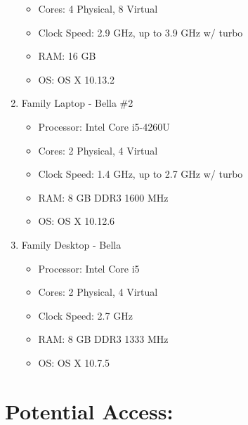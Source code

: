 \documentclass[11pt]{article}
\begin{document}
\begin{enumerate}
{\begin{itemize}
	\item{Cores: 4 Physical, 8 Virtual}
	\item{Clock Speed: 2.9 GHz, up to 3.9 GHz w/ turbo}
	\item{RAM: 16 GB}
	\item{OS: OS X 10.13.2}
	\end{itemize}
	}
\item{Family Laptop - Bella \#2
	\begin{itemize}
	\item{Processor: Intel Core i5-4260U}
	\item{Cores: 2 Physical, 4 Virtual}
	\item{Clock Speed: 1.4 GHz, up to 2.7 GHz w/ turbo}
	\item{RAM: 8 GB DDR3 1600 MHz}
	\item{OS: OS X 10.12.6}
	\end{itemize}
	}
\item{Family Desktop - Bella
	\begin{itemize}
	\item{Processor: Intel Core i5}
	\item{Cores: 2 Physical, 4 Virtual}
	\item{Clock Speed: 2.7 GHz}
	\item{RAM: 8 GB DDR3 1333 MHz}
	\item{OS: OS X 10.7.5}
	\end{itemize}
	}
\end{enumerate}


\section{Potential Access:}
\end{document}
